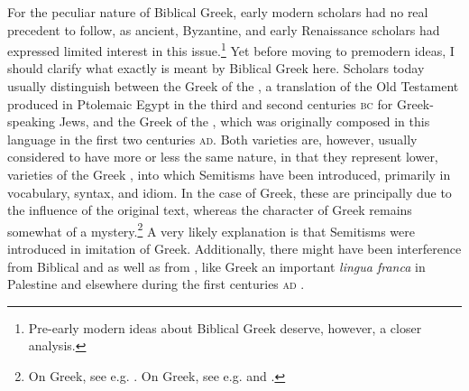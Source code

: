 For the peculiar nature of Biblical Greek, early modern scholars had no real precedent to follow, as ancient, Byzantine, and early Renaissance scholars had expressed limited interest in this issue.\footnote{Pre-early modern ideas about Biblical Greek deserve, however, a closer analysis.} Yet before moving to premodern ideas, I should clarify what exactly is meant by Biblical Greek here. Scholars today usually distinguish between the Greek of the , a translation of the  Old Testament produced in Ptolemaic Egypt in the third and second centuries \textsc{bc} for Greek-speaking Jews, and the Greek of the , which was originally composed in this language in the first two centuries \textsc{ad}. Both varieties are, however, usually considered to have more or less the same nature, in that they represent lower,  varieties of the Greek , into which Semitisms have been introduced, primarily in vocabulary, syntax, and idiom. In the case of  Greek, these are principally due to the influence of the original  text, whereas the  character of  Greek remains somewhat of a mystery.\footnote{On  Greek, see e.g. \citet[106--108]{Horrocks2010}. On  Greek, see e.g. \citet{Janse2007} and \citet{Porter2013}.} A very likely explanation is that Semitisms were introduced in imitation of  Greek. Additionally, there might have been interference from Biblical and  as well as from , like Greek an important \textit{lingua franca} in Palestine and elsewhere during the first centuries \textsc{ad} \citep{Janse2007}.

